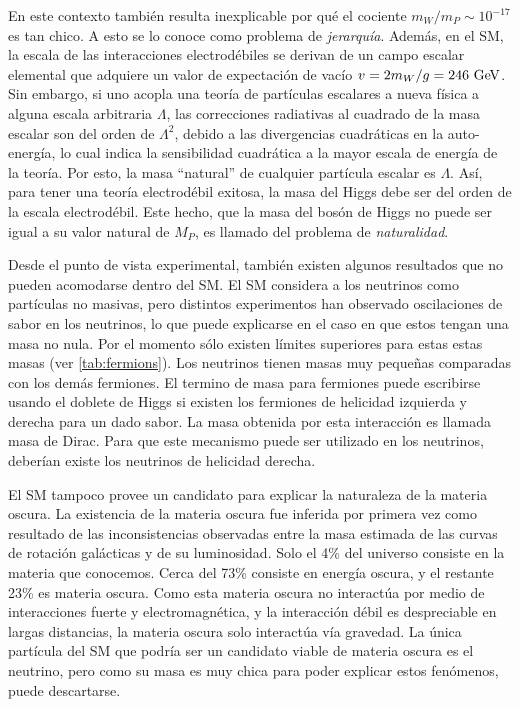 En este contexto también resulta inexplicable por qué el cociente $m_W/m_P \sim
10^{-17}$ es tan chico. A esto se lo conoce como problema de \emph{jerarquía}.
Además, en el SM, la escala de las interacciones electrodébiles se derivan de un
campo escalar elemental que adquiere un valor de expectación de vacío $v = 2
m_W /g = 246 \gev$. Sin embargo, si uno acopla una teoría de partículas
escalares a nueva física a alguna escala arbitraria $\Lambda$, las correcciones
radiativas al cuadrado de la masa escalar son del orden de $\Lambda^2$, debido a
las divergencias cuadráticas en la auto-energía, lo cual indica la sensibilidad
cuadrática a la mayor escala de energía de la teoría. Por esto, la masa
``natural'' de cualquier partícula escalar es $\Lambda$. Así, para tener una teoría
electrodébil exitosa, la masa del Higgs debe ser del orden de la escala
electrodébil. Este hecho, que la masa del bosón de Higgs no puede ser igual a su
valor natural de $M_P$, es llamado del problema de \emph{naturalidad}.

Desde el punto de vista experimental, también existen algunos resultados que no
pueden acomodarse dentro del SM. El SM considera a los neutrinos como partículas
no masivas, pero distintos
experimentos\cite{PhysRevLett.101.111301,PhysRevD.78.032002} han observado
oscilaciones de sabor en los neutrinos, lo que puede explicarse en el caso en
que estos tengan una masa no nula. Por el momento sólo existen límites
superiores para estas estas masas (ver \cref{tab:fermions}). Los neutrinos
tienen masas muy peque\~nas comparadas con los demás fermiones. El termino de
masa para fermiones puede escribirse usando el doblete de Higgs si existen los
fermiones de helicidad izquierda y derecha para un dado sabor. La masa obtenida
por esta interacción es llamada masa de Dirac. Para que este mecanismo puede ser
utilizado en los neutrinos, deberían existe los neutrinos de helicidad derecha.

El SM tampoco provee un candidato para explicar la naturaleza de la materia
oscura. La existencia de la materia oscura fue inferida por primera vez como
resultado de las inconsistencias observadas entre la masa estimada de las curvas
de rotación galácticas y de su luminosidad\cite{DM1}.
Solo el 4\% del universo consiste en la materia que
conocemos\cite{DM2}. Cerca del 73\% consiste en energía oscura, y el restante
23\% es materia oscura. Como esta materia oscura no interactúa por medio de
interacciones fuerte y electromagnética, y la interacción débil es despreciable
en largas distancias, la materia oscura solo interactúa vía gravedad. La única
partícula del SM que podría ser un candidato viable de materia oscura es el
neutrino, pero como su masa es muy chica para poder explicar estos fenómenos,
puede descartarse.

